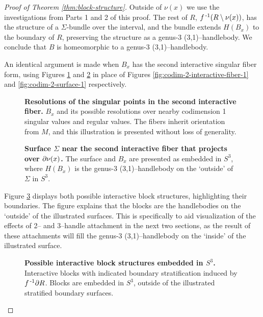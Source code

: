 \begin{proof}[Proof of Theorem \ref{thm:block-structure}]
	Outside of $\nu(x)$ we use the investigations from Parts 1 and 2 of this proof. The rest of $R$, $f^{\,\text{-}1}(R\setminus\nu(x))$, has the structure of a $\Sigma$-bundle over the interval, and the bundle extends $H(B_x)$ to the boundary of $R$, preserving the structure as a genus-3 (3,1)--handlebody.
	We conclude that $B$ is homeomorphic to a genus-3 (3,1)--handlebody.
	
	An identical argument is made when $B_x$ has the second interactive singular fiber form, using Figures \ref{fig:codim-2-interactive-fiber-2} and \ref{fig:codim-2-surface-2} in place of Figures \ref{fig:codim-2-interactive-fiber-1} and \ref{fig:codim-2-surface-1} respectively.
	
	\begin{figure}[h!]
		\caption{
			\textbf{Resolutions of the singular points in the second interactive fiber.}
			$B_x$ and its possible resolutions over nearby codimension 1 singular values and regular values.
			The fibers inherit orientation from $M$, and this illustration is presented without loss of generality.
		}
		\label{fig:codim-2-interactive-fiber-2}
	\end{figure}

	\begin{figure}[h!]
		\caption{
			\textbf{Surface $\Sigma$ near the second interactive fiber that projects over $\partial\nu(x)$.}
			The surface and $B_x$ are presented as embedded in $S^3$, where $H(B_x)$ is the genus-3 (3,1)--handlebody on the `outside' of $\Sigma$ in $S^3$.
		}
		\label{fig:codim-2-surface-2}
	\end{figure}

	Figure \ref{fig:codim-2-blocks} displays both possible interactive block structures, highlighting their boundaries.
	The figure explains that the blocks are the handlebodies on the `outside' of the illustrated surfaces.
	This is specifically to aid visualization of the effects of 2-- and 3--handle attachment in the next two sections, as the result of these attachments will fill the genus-3 (3,1)--handlebody on the `inside' of the illustrated surface.

	\begin{figure}[h!]
	\caption{
		\textbf{Possible interactive block structures embedded in $S^3$.}
		Interactive blocks with indicated boundary stratification induced by $f^{\,\text{-}1} \partial R$.
		Blocks are embedded in $S^3$, outside of the illustrated stratified boundary surfaces.
	}
	\label{fig:codim-2-blocks}
	\end{figure}
\end{proof}

